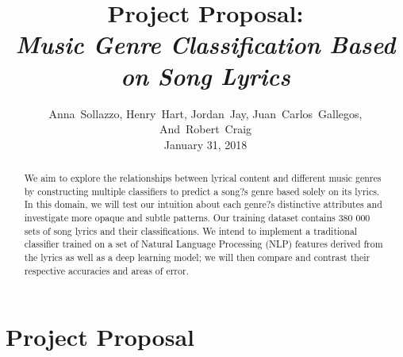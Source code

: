\documentclass[journal]{IEEEtran}
\begin{document}
\title{Project Proposal:\\\emph{Music Genre Classification Based on Song Lyrics}}

\author{Anna~Sollazzo,
        Henry~Hart,
        Jordan~Jay,
        Juan~Carlos~Gallegos,
        And~Robert~Craig \\ January 31, 2018}
        
\maketitle


\begin{abstract}

    We aim to explore the relationships between lyrical content and different music genres by constructing multiple classifiers to predict a song?s genre based solely on its lyrics. In this domain, we will test our intuition about each genre?s distinctive attributes and investigate more opaque and subtle patterns. Our training dataset contains 380 000 sets of song lyrics and their classifications. We intend to implement a traditional classifier trained on a set of Natural Language Processing (NLP) features derived from the lyrics as well as a deep learning model; we will then compare and contrast their respective accuracies and areas of error.\par

\end{abstract}

\section{Project Proposal}
\end{document}
